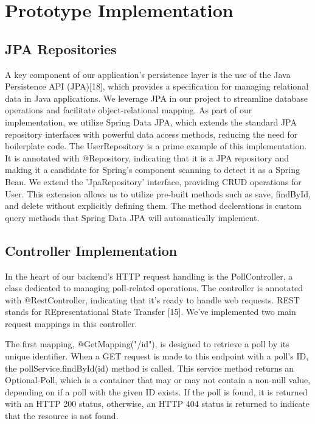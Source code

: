 \section{Prototype Implementation}
\label{sec:implementation}

\subsection{JPA Repositories}
A key component of our application's persistence layer is the use of the Java Persistence API (JPA)[18], which provides a specification for managing relational data in Java applications. We leverage JPA in our project to streamline database operations and facilitate object-relational mapping. As part of our implementation, we utilize Spring Data JPA, which extends the standard JPA repository interfaces with powerful data access methods, reducing the need for boilerplate code.
The UserRepository is a prime example of this implementation. It is annotated with @Repository, indicating that it is a JPA repository and making it a candidate for Spring's component scanning to detect it as a Spring Bean.
We extend the 'JpaRepository' interface, providing CRUD operations for User. This extension allows us to utilize pre-built methods such as save, findById, and delete without explicitly defining them.
The method declerations is custom query methods that Spring Data JPA will automatically implement.


\subsection{Controller Implementation}
In the heart of our backend's HTTP request handling is the PollController, a class dedicated to managing poll-related operations. The controller is annotated with @RestController, indicating that it's ready to handle web requests. REST stands for REpresentational State Transfer [15]. We've implemented two main request mappings in this controller.

The first mapping, @GetMapping("/{id}"), is designed to retrieve a poll by its unique identifier. When a GET request is made to this endpoint with a poll's ID, the pollService.findById(id) method is called. This service method returns an Optional-Poll, which is a container that may or may not contain a non-null value, depending on if a poll with the given ID exists. If the poll is found, it is returned with an HTTP 200 status, otherwise, an HTTP 404 status is returned to indicate that the resource is not found.


